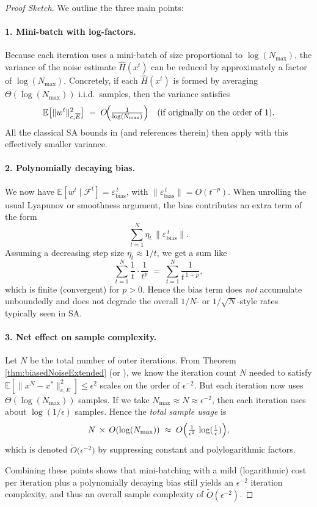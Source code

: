 \begin{proof}[Proof Sketch]
We outline the three main points:

\paragraph{1. Mini-batch with log-factors.}
Because each iteration uses a mini-batch of size proportional to \(\log(N_{\max})\), the variance of the noise estimate \(\widehat{H}(x^t)\) can be reduced by approximately a factor of \(\log(N_{\max})\).  Concretely, if each \(\widehat{H}(x^t)\) is formed by averaging \(\Theta(\log(N_{\max}))\) i.i.d.\ samples, then the variance satisfies
\[
   \mathbb{E}\bigl[\|w^t\|^2_{c,\overline{E}}\bigr]
   \;=\;
   O\!\Bigl(\tfrac{1}{\log(N_{\max})}\Bigr)
   \quad
   \text{(if originally on the order of 1).}
\]
All the classical SA bounds in \citep{zhang2021finite} (and references therein) then apply with this effectively smaller variance.

\paragraph{2. Polynomially decaying bias.}
We now have
\(\mathbb{E}[w^t \mid \mathcal{F}^t] 
   = \varepsilon_{\text{bias}}^{\,t}\),
with \(\|\varepsilon_{\text{bias}}^{\,t}\| = O(t^{-p})\).  
When unrolling the usual Lyapunov or smoothness argument, the bias contributes an extra term of the form
\[
   \sum_{t=1}^N \eta_t\,\bigl\|\varepsilon_{\text{bias}}^{\,t}\bigr\|.
\]
Assuming a decreasing step size \(\eta_t \approx 1/t\), 
we get a sum like
\[
   \sum_{t=1}^N 
     \frac{1}{t}\cdot \frac{1}{t^p}
   \;=\;
   \sum_{t=1}^N
     \frac{1}{t^{\,1+p}},
\]
which is finite (convergent) for \(p>0\).  Hence the bias term does \emph{not} accumulate unboundedly and does not degrade the overall \(1/N\)- or \(1/\sqrt{N}\)-style rates typically seen in SA.  

\paragraph{3. Net effect on sample complexity.}
Let \(N\) be the total number of outer iterations.  From Theorem\,\ref{thm:biasedNoiseExtended} (or \citep[Theorem\,3]{zhang2021finite}), we know the iteration count \(N\) needed to satisfy 
\(\mathbb{E}[\|x^N - x^*\|^2_{c,\overline{E}}]\le \epsilon^2\)
scales on the order of \(\epsilon^{-2}\).  
But each iteration now uses \(\Theta(\log(N_{\max}))\) samples.  If we take \(N_{\max} \approx N\approx \epsilon^{-2}\), then each iteration uses about \(\log(1/\epsilon)\) samples.  Hence the \emph{total sample usage} is
\[
   N \,\times\, O(\log(N_{\max}))
   \;\approx\;
   O\Bigl(\tfrac{1}{\epsilon^2}\,\log(\tfrac{1}{\epsilon})\Bigr),
\]
which is denoted 
\(\widetilde{O}\bigl(\epsilon^{-2}\bigr)\) 
by suppressing constant and polylogarithmic factors.  

Combining these points shows that mini-batching with a mild (logarithmic) cost per iteration plus a polynomially decaying bias still yields an \(\epsilon^{-2}\) iteration complexity, and thus an overall sample complexity of \(\widetilde{O}(\epsilon^{-2})\).
\end{proof}



